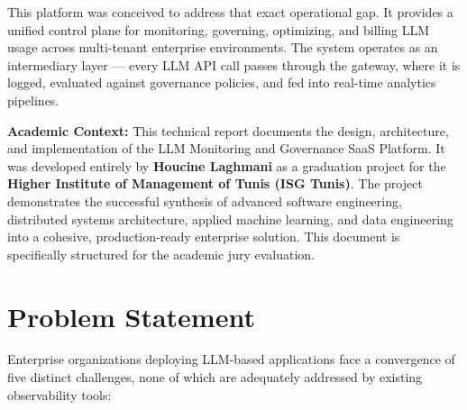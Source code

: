 \documentclass[12pt,a4paper,twoside]{report}
\begin{document}
This platform was conceived to address that exact operational gap. It provides a unified control plane for monitoring, governing, optimizing, and billing LLM usage across multi-tenant enterprise environments. The system operates as an intermediary layer — every LLM API call passes through the gateway, where it is logged, evaluated against governance policies, and fed into real-time analytics pipelines.

\textbf{Academic Context:} This technical report documents the design, architecture, and implementation of the LLM Monitoring and Governance SaaS Platform. It was developed entirely by \textbf{Houcine Laghmani} as a graduation project for the \textbf{Higher Institute of Management of Tunis (ISG Tunis)}. The project demonstrates the successful synthesis of advanced software engineering, distributed systems architecture, applied machine learning, and data engineering into a cohesive, production-ready enterprise solution. This document is specifically structured for the academic jury evaluation.

\section{Problem Statement}

Enterprise organizations deploying LLM-based applications face a convergence of five distinct challenges, none of which are adequately addressed by existing observability tools:
\end{document}
